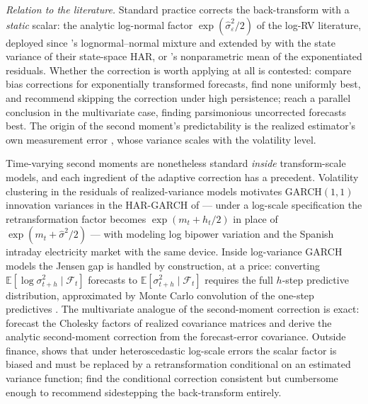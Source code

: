 \emph{Relation to the literature.} Standard practice corrects the
back-transform with a \emph{static} scalar: the analytic log-normal
factor $\exp(\hat\sigma^2_\varepsilon / 2)$ of the log-RV literature,
deployed since \citet{AndersenBollerslevDieboldLabys2003}'s
lognormal--normal mixture and extended by \citet{BekiermanManner2018}
with the state variance of their state-space HAR, or
\citet{Duan1983}'s nonparametric mean of the exponentiated residuals.
Whether the correction is worth applying at all is contested:
\citet{DemetrescuGolosnoyTitova2020} compare bias corrections for
exponentially transformed forecasts, find none uniformly best, and
recommend skipping the correction under high persistence;
\citet{HalbleibVoev2011} reach a parallel conclusion in the
multivariate case, finding parsimonious uncorrected forecasts best.
The origin of the second moment's predictability is the realized
estimator's own measurement error
\citep{AsaiMcAleerMedeiros2012}, whose variance scales with the
volatility level.

Time-varying second moments are nonetheless standard \emph{inside}
transform-scale models, and each ingredient of the adaptive correction
has a precedent. Volatility clustering in the residuals of
realized-variance models motivates GARCH$(1,1)$ innovation variances
in the HAR-GARCH of \citet{CorsiMittnikPigorschPigorsch2008} ---
under a log-scale specification the retransformation factor becomes
$\exp(m_t + h_t/2)$ in place of $\exp(m_t + \hat\sigma^2/2)$ ---
with \citet{BollerslevKretschmerPigorschTauchen2009} modeling log
bipower variation and \citet{CiarretaZarraga2016} the Spanish
intraday electricity market with the same device. Inside log-variance
GARCH models the Jensen gap is handled by construction, at a price:
converting $\mathbb{E}[\log \sigma^2_{t+h} \mid \mathcal{F}_t]$
forecasts to $\mathbb{E}[\sigma^2_{t+h} \mid \mathcal{F}_t]$ requires
the full $h$-step predictive distribution, approximated by Monte Carlo
convolution of the one-step predictives
\citep{AndersenBollerslevChristoffersenDiebold2006}. The multivariate
analogue of the second-moment correction is exact: \citet{ChiriacVoev2011}
forecast the Cholesky factors of realized covariance matrices and
derive the analytic second-moment correction from the forecast-error
covariance. Outside finance, \citet{Manning1998} shows that under
heteroscedastic log-scale errors the scalar \citet{Duan1983} factor is
biased and must be replaced by a retransformation conditional on an
estimated variance function; \citet{ManningMullahy2001} find the
conditional correction consistent but cumbersome enough to recommend
sidestepping the back-transform entirely.


